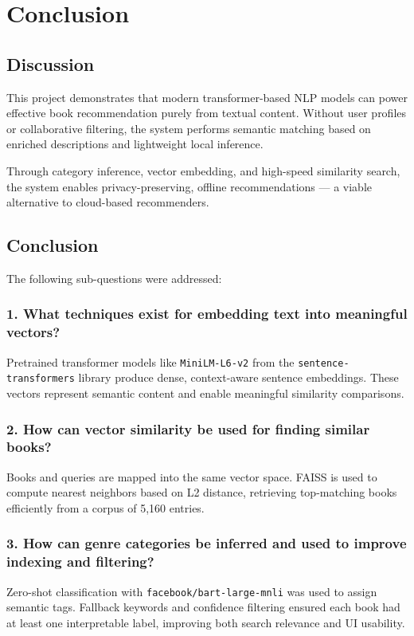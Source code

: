 \chapter{Conclusion}
\label{chapter:conclusion}

\section{Discussion}
\label{sec:discussion}

This project demonstrates that modern transformer-based NLP models can power effective book recommendation purely from textual content. Without user profiles or collaborative filtering, the system performs semantic matching based on enriched descriptions and lightweight local inference.

Through category inference, vector embedding, and high-speed similarity search, the system enables privacy-preserving, offline recommendations — a viable alternative to cloud-based recommenders.

\section{Conclusion}
\label{sec:conclusion}

The following sub-questions were addressed:

\subsection*{1. What techniques exist for embedding text into meaningful vectors?}
Pretrained transformer models like \texttt{MiniLM-L6-v2} from the \texttt{sentence-transformers} library produce dense, context-aware sentence embeddings. These vectors represent semantic content and enable meaningful similarity comparisons.

\subsection*{2. How can vector similarity be used for finding similar books?}
Books and queries are mapped into the same vector space. FAISS is used to compute nearest neighbors based on L2 distance, retrieving top-matching books efficiently from a corpus of 5,160 entries.

\subsection*{3. How can genre categories be inferred and used to improve indexing and filtering?}
Zero-shot classification with \texttt{facebook/bart-large-mnli} was used to assign semantic tags. Fallback keywords and confidence filtering ensured each book had at least one interpretable label, improving both search relevance and UI usability.

